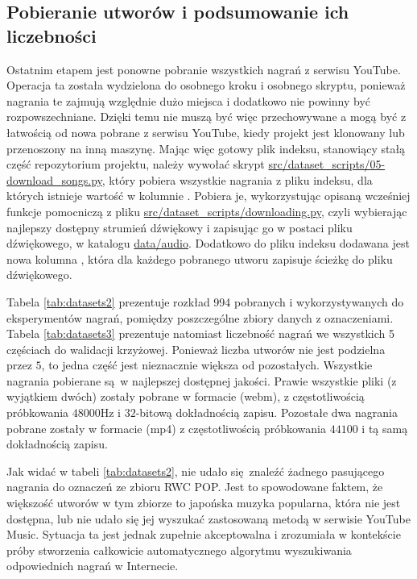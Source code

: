\subsection{Pobieranie utworów i podsumowanie ich liczebności}

Ostatnim etapem jest ponowne pobranie wszystkich nagrań z serwisu YouTube. Operacja ta została wydzielona do osobnego kroku i osobnego skryptu, ponieważ nagrania te zajmują względnie dużo miejsca i dodatkowo nie powinny być rozpowszechniane. Dzięki temu nie muszą być więc przechowywane a mogą być z łatwością od nowa pobrane z serwisu YouTube, kiedy projekt jest klonowany lub przenoszony na inną maszynę. Mając więc gotowy plik indeksu, stanowiący stałą część repozytorium projektu, należy wywołać skrypt \url{src/dataset_scripts/05-download_songs.py}, który pobiera wszystkie nagrania z pliku indeksu, dla których istnieje wartość w kolumnie . Pobiera je, wykorzystując opisaną wcześniej funkcje pomocniczą z pliku \url{src/dataset_scripts/downloading.py}, czyli wybierając najlepszy dostępny strumień dźwiękowy i zapisując go w postaci pliku dźwiękowego, w katalogu \url{data/audio}. Dodatkowo do pliku indeksu dodawana jest nowa kolumna , która dla każdego pobranego utworu zapisuje ścieżkę do pliku dźwiękowego.

Tabela \ref{tab:datasets2} prezentuje rozkład 994 pobranych i wykorzystywanych do eksperymentów nagrań, pomiędzy poszczególne zbiory danych z oznaczeniami. Tabela \ref{tab:datasets3} prezentuje natomiast liczebność nagrań we wszystkich 5 częściach do walidacji krzyżowej. Ponieważ liczba utworów nie jest podzielna przez $5$, to jedna część jest nieznacznie większa od pozostałych.  Wszystkie nagrania pobierane są w najlepszej dostępnej jakości. Prawie wszystkie pliki (z wyjątkiem dwóch) zostały pobrane w formacie \filetype(webm), z częstotliwością próbkowania $48000$Hz i $32$-bitową dokładnością zapisu.  Pozostałe dwa nagrania pobrane zostały w formacie \filetype(mp4) z częstotliwością próbkowania $44100$ i tą samą dokładnością zapisu.

Jak widać w tabeli \ref{tab:datasets2}, nie udało się znaleźć żadnego pasującego nagrania do oznaczeń ze zbioru RWC POP. Jest to spowodowane faktem, że większość utworów w tym zbiorze to japońska muzyka popularna, która nie jest dostępna, lub nie udało się jej wyszukać zastosowaną metodą w serwisie YouTube Music. Sytuacja ta jest jednak zupełnie akceptowalna i zrozumiała w kontekście próby stworzenia całkowicie automatycznego algorytmu wyszukiwania odpowiednich nagrań w Internecie.

